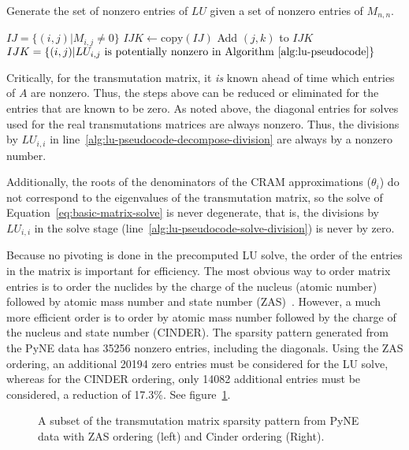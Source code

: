 \begin{algorithm}[h]
  \caption{Generate the set of nonzero entries of $LU$ given a set of nonzero
    entries of $M_{n,n}$.}\label{alg:make-ijk}
  \begin{algorithmic}[1]
  \REQUIRE $IJ=\{(i, j) | M_{i, j} \neq 0\}$
  \STATE $IJK \leftarrow \mathrm{copy}(IJ)$
  \STATE
              \CONTINUE
          \ENDIF
          \STATE
                   \STATE Add $(j, k)$ to $IJK$
               \ENDIF
          \ENDFOR
      \ENDFOR
  \ENDFOR
  \ENSURE $IJK=\{(i,j)|LU_{i,j}\mathrm{\ is\ potentially\ nonzero\ in\ Algorithm~\ref{alg:lu-pseudocode}}\}$
\end{algorithmic}
\end{algorithm}

Critically, for the transmutation matrix, it \textit{is} known ahead of time
which entries of $A$ are nonzero. Thus, the steps above can be reduced or
eliminated for the entries that are known to be zero. As noted above, the
diagonal entries for solves used for the real transmutations matrices are
always nonzero. Thus, the divisions by $LU_{i,i}$ in
line~\ref{alg:lu-pseudocode-decompose-division} are always by a nonzero
number.

Additionally, the roots of the denominators of the CRAM approximations
($\theta_i$) do not correspond to the eigenvalues of the transmutation matrix,
so the solve of Equation~\ref{eq:basic-matrix-solve} is never degenerate, that
is, the divisions by $LU_{i,i}$ in the solve stage
(line~\ref{alg:lu-pseudocode-solve-division}) is never by zero.

Because no pivoting is done in the precomputed LU solve, the order of the
entries in the matrix is important for efficiency. The most obvious way to
order matrix entries is to order the nuclides by the charge of the nucleus
(atomic number) followed by atomic mass number and state number
(ZAS)~\cite{ationneeded}. However, a much more efficient order is to order by
atomic mass number followed by the charge of the nucleus and state number
(CINDER). The sparsity pattern generated from the PyNE data has 35256
nonzero entries, including the diagonals. Using the ZAS ordering, an
additional 20194 zero entries must be considered for the LU solve, whereas for
the CINDER ordering, only 14082 additional entries must be considered, a
reduction of 17.3\%. See figure~\ref{fig:lu-solve-ordering}.

\begin{figure}[!ht]
\centering
\resizebox{0.9\textwidth}{!}{}
\caption{A subset of the transmutation matrix sparsity pattern from PyNE data
  with ZAS ordering (left) and Cinder ordering (Right).}
\label{fig:lu-solve-ordering}
\end{figure}
